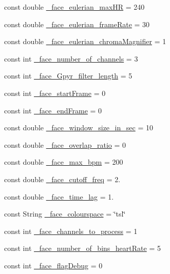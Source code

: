 \begin{DoxyCompactItemize}
const double \hyperlink{namespace_m_h_r_a366f66e2cd387cf039dc5d7de4ff5f9d}{\+\_\+face\+\_\+eulerian\+\_\+max\+H\+R} = 240
\item 
const double \hyperlink{namespace_m_h_r_a3c21f6619922e618bff40700a5723015}{\+\_\+face\+\_\+eulerian\+\_\+frame\+Rate} = 30
\item 
const double \hyperlink{namespace_m_h_r_a5b039641e0cf1a30ba4f303e4764b4c8}{\+\_\+face\+\_\+eulerian\+\_\+chroma\+Magnifier} = 1
\item 
const int \hyperlink{namespace_m_h_r_a1af8c23e0ffae759111c964d2369a13b}{\+\_\+face\+\_\+number\+\_\+of\+\_\+channels} = 3
\item 
const int \hyperlink{namespace_m_h_r_a7eabffdab2df22a98e5aa4046d6c3baf}{\+\_\+face\+\_\+\+Gpyr\+\_\+filter\+\_\+length} = 5
\item 
const int \hyperlink{namespace_m_h_r_ac893410fca7e7a76ae562e47f8371cc1}{\+\_\+face\+\_\+start\+Frame} = 0
\item 
const int \hyperlink{namespace_m_h_r_a349e142bd15540a9d0b5b63f426fc3dc}{\+\_\+face\+\_\+end\+Frame} = 0
\item 
const double \hyperlink{namespace_m_h_r_ada7fab40b0e865f6a26751fd550b5288}{\+\_\+face\+\_\+window\+\_\+size\+\_\+in\+\_\+sec} = 10
\item 
const double \hyperlink{namespace_m_h_r_ab6430d316d9d82ce08b7d35fda6ba14e}{\+\_\+face\+\_\+overlap\+\_\+ratio} = 0
\item 
const double \hyperlink{namespace_m_h_r_a123d7bba4eba9d4c49ebe21458394a9a}{\+\_\+face\+\_\+max\+\_\+bpm} = 200
\item 
const double \hyperlink{namespace_m_h_r_afc5d67d6a0c4929f2fc30dce703740fe}{\+\_\+face\+\_\+cutoff\+\_\+freq} = 2.
\item 
const double \hyperlink{namespace_m_h_r_ad108537351ba024dfa150411983a69c4}{\+\_\+face\+\_\+time\+\_\+lag} = 1.
\item 
const String \hyperlink{namespace_m_h_r_a2c3d7c5df37d2106e5f4351ebeb44c2f}{\+\_\+face\+\_\+colourspace} = \char`\"{}tsl\char`\"{}
\item 
const int \hyperlink{namespace_m_h_r_ac3a2dbcaefbcbb5814108c711ebd1fe1}{\+\_\+face\+\_\+channels\+\_\+to\+\_\+process} = 1
\item 
const int \hyperlink{namespace_m_h_r_abfcdcdfbf5694a70c871df5484e30321}{\+\_\+face\+\_\+number\+\_\+of\+\_\+bins\+\_\+heart\+Rate} = 5
\item 
const int \hyperlink{namespace_m_h_r_ade58b99d0d2023434646cb0597baafdf}{\+\_\+face\+\_\+flag\+Debug} = 0

\end{DoxyCompactItemize}
